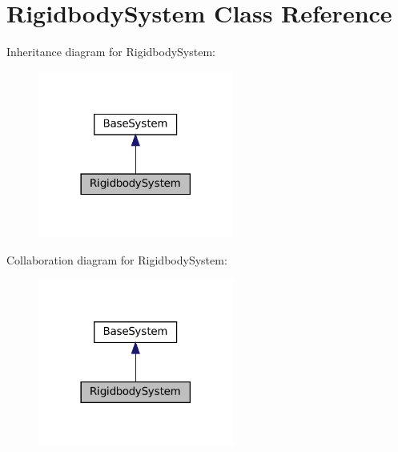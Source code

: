 \hypertarget{classRigidbodySystem}{}\section{Rigidbody\+System Class Reference}
\label{classRigidbodySystem}


Inheritance diagram for Rigidbody\+System\+:\nopagebreak
\begin{figure}[H]
\begin{center}
\leavevmode
\includegraphics[width=182pt]{classRigidbodySystem__inherit__graph}
\end{center}
\end{figure}


Collaboration diagram for Rigidbody\+System\+:\nopagebreak
\begin{figure}[H]
\begin{center}
\leavevmode
\includegraphics[width=182pt]{classRigidbodySystem__coll__graph}
\end{center}
\end{figure}

